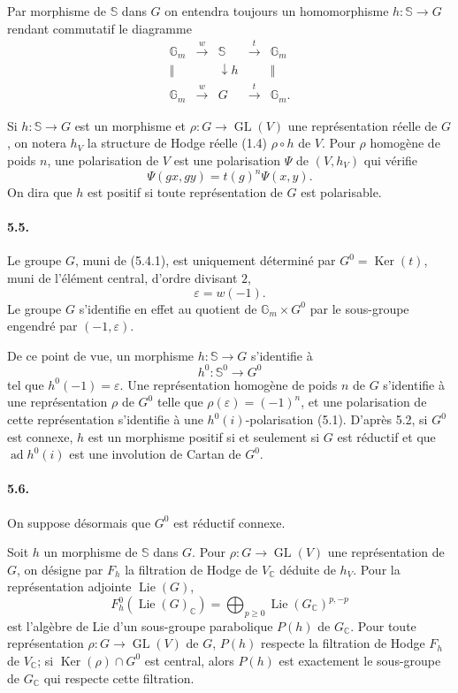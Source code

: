 \documentclass[10pt]{article}
\newcommand{\C}{\mathbb C}
\newcommand{\bS}{\mathbb S}
\newcommand{\Ker}{\operatorname{Ker}}
\theoremstyle{deligne}
\newcommand{\Lie}{\operatorname{Lie}}
\newcommand{\ad}{\operatorname{ad}}
\newcommand{\GL}{\operatorname{GL}}
\begin{document}
Par morphisme de $\bS$ dans $G$ on entendra toujours un homomorphisme $h:\bS\to G$ rendant commutatif le diagramme
\[
\begin{array}{ccccc}
\mathbb G_m&\xrightarrow{w}&\bS&\xrightarrow{t}&\mathbb G_m\\
\Vert&&\downarrow h&&\Vert\\
\mathbb G_m&\xrightarrow{w}&G&\xrightarrow{t}&\mathbb G_m .
\end{array}
\]

Si $h:\bS\to G$ est un morphisme et $\rho:G\to\GL(V)$ une représentation réelle de $G$, on notera $h_V$ la structure de Hodge réelle (1.4) $\rho\circ h$ de $V$. Pour $\rho$ homogène de poids $n$, une polarisation de $V$ est une polarisation $\Psi$ de $(V,h_V)$ qui vérifie
\[
\tag{5.4.2}
  \Psi(gx,gy)=t(g)^n\Psi(x,y).
\]
On dira que $h$ est positif si toute représentation de $G$ est polarisable.

\paragraph{5.5.}
Le groupe $G$, muni de (5.4.1), est uniquement déterminé par $G^0=\Ker(t)$, muni de l'élément central, d'ordre divisant $2$,
\[
  \varepsilon=w(-1).
\]
Le groupe $G$ s'identifie en effet au quotient de $\mathbb G_m\times G^0$ par le sous-groupe engendré par $(-1,\varepsilon)$.

De ce point de vue, un morphisme $h:\bS\to G$ s'identifie à
\[
  h^0:\bS^0\to G^0
\]
tel que $h^0(-1)=\varepsilon$. Une représentation homogène de poids $n$ de $G$ s'identifie à une représentation $\rho$ de $G^0$ telle que $\rho(\varepsilon)=(-1)^n$, et une polarisation de cette représentation s'identifie à une $h^0(i)$-polarisation (5.1). D'après 5.2, si $G^0$ est connexe, $h$ est un morphisme positif si et seulement si $G$ est réductif et que $\ad h^0(i)$ est une involution de Cartan de $G^0$.

\paragraph{5.6.}
On suppose désormais que $G^0$ est réductif connexe.

Soit $h$ un morphisme de $\bS$ dans $G$. Pour $\rho:G\to\GL(V)$ une représentation de $G$, on désigne par $F_h$ la filtration de Hodge de $V_\C$ déduite de $h_V$. Pour la représentation adjointe $\Lie(G)$,
\[
\tag{5.6.1}
  F_h^0(\Lie(G)_\C)=\bigoplus_{p\ge0}\Lie(G_\C)^{p,-p}
\]
est l'algèbre de Lie d'un sous-groupe parabolique $P(h)$ de $G_\C$. Pour toute représentation $\rho:G\to\GL(V)$ de $G$, $P(h)$ respecte la filtration de Hodge $F_h$ de $V_\C$; si $\Ker(\rho)\cap G^0$ est central, alors $P(h)$ est exactement le sous-groupe de $G_\C$ qui respecte cette filtration.
\end{document}
